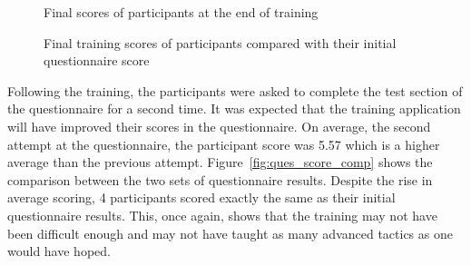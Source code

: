 \documentclass{l4proj}
\begin{document}
\begin{figure}[H]
    \centering
    \caption{Final scores of participants at the end of training}
    \label{fig:training_score}
\end{figure}

\begin{figure}[H]
    \centering
    \caption{Final training scores of participants compared with their initial questionnaire score}
    \label{fig:score_comp}
\end{figure}

Following the training, the participants were asked to complete the test section of the questionnaire for a second time. It was expected that the training application will have improved their scores in the questionnaire. On average, the second attempt at the questionnaire, the participant score was 5.57 which is a higher average than the previous attempt. Figure~\ref{fig:ques_score_comp} shows the comparison between the two sets of questionnaire results. Despite the rise in average scoring, 4 participants scored exactly the same as their initial questionnaire results. This, once again, shows that the training may not have been difficult enough and may not have taught as many advanced tactics as one would have hoped.
\end{document}
